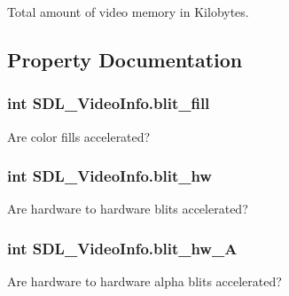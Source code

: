 Total amount of video memory in Kilobytes. 



\subsection{Property Documentation}
\hypertarget{struct_s_d_l___video_info_aa4aae0fa07a0f6b5f207dafe7154f391}{
\subsubsection[{blit\_\-fill}]{\setlength{\rightskip}{0pt plus 5cm}int SDL\_\-VideoInfo.blit\_\-fill}}
\label{struct_s_d_l___video_info_aa4aae0fa07a0f6b5f207dafe7154f391}


Are color fills accelerated? 

\hypertarget{struct_s_d_l___video_info_a87b8c2835494b2525890b17363d312b3}{
\subsubsection[{blit\_\-hw}]{\setlength{\rightskip}{0pt plus 5cm}int SDL\_\-VideoInfo.blit\_\-hw}}
\label{struct_s_d_l___video_info_a87b8c2835494b2525890b17363d312b3}


Are hardware to hardware blits accelerated? 

\hypertarget{struct_s_d_l___video_info_a5ce254b40d69f53b1cc895a6a76fd714}{
\subsubsection[{blit\_\-hw\_\-A}]{\setlength{\rightskip}{0pt plus 5cm}int SDL\_\-VideoInfo.blit\_\-hw\_\-A}}
\label{struct_s_d_l___video_info_a5ce254b40d69f53b1cc895a6a76fd714}


Are hardware to hardware alpha blits accelerated? 

